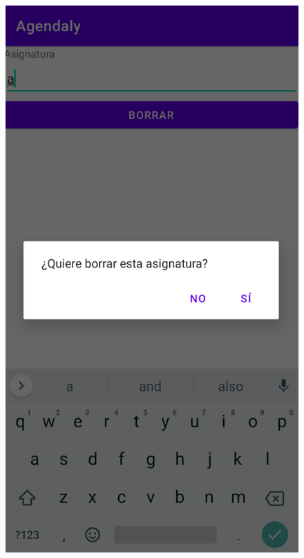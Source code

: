 \documentclass[a4paper,openright,12pt]{article}
\begin{document}
\begin{figure}
             \includegraphics[scale=0.05]{avisoBorr.png}

\end{figure}
\end{document}
